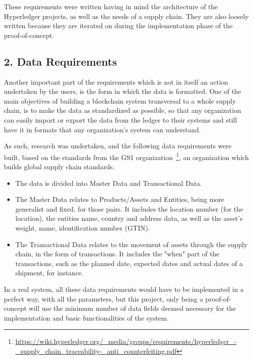 These requirements were written having in mind the architecture of the Hyperledger projects, as well as the needs of a supply chain. They are also loosely written because they are iterated on during the implementation phase of the proof-of-concept.

\subsection*{2. Data Requirements}

Another important part of the requirements which is not in itself an action undertaken by the users, is the form in which the data is formatted. One of the main objectives of building a blockchain system transversal to a whole supply chain, is to make the data as standardized as possible, so that any organization can easily import or export the data from the ledger to their systems and still have it in formats that any organization's system can understand. 

As such, research was undertaken, and the following data requirements were built, based on the standards from the GS1 organization~\footnote{\url{https://wiki.hyperledger.org/\_media/groups/requirements/hyperledger\_-\_supply\_chain\_traceability-\_anti\_counterfeiting.pdf}}, an organization which builds global supply chain standards.

\begin{itemize}
	\item The data is divided into Master Data and Transactional Data.
	\item The Master Data relates to Products/Assets and Entities, being more generalist and fixed, for those pairs. It includes the location number (for the location), the entities name, country and address data, as well as the asset's weight, name, identification number (GTIN).
	\item The Transactional Data relates to the movement of assets through the supply chain, in the form of transactions. It includes the "when" part of the transactions, such as the planned date, expected dates and actual dates of a shipment, for instance.
\end{itemize}

In a real system, all these data requirements would have to be implemented in a perfect way, with all the parameters, but this project, only being a proof-of-concept will use the minimum number of data fields deemed necessary for the implementation and basic functionalities of the system.
		
